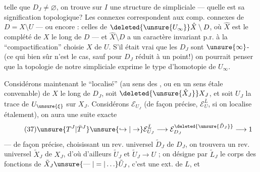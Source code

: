 
telle que $D_J\ne\varnothing$,  on trouve sur $I$ une structure de   simpliciale --- quelle est sa signification topologique? Les  connexes correspondent aux comp. connexes de $D=X\setminus U$ --- ou encore : celles de $\deleted{\unsure{U_\infty}}\hat X\setminus D$, où $\hat X$ est le  complété de $X$ le long de $D$ --- et $\hat X\setminus D$ a un caractère invariant p.r. à la ``compactification'' choisie $X$ de $U$. S'il était vrai que les $D_J$  sont $\unsure{\infty}$- (ce qui bien sûr n'est \uline{} le cas, sauf pour $D_J$ réduit à un point!) on pourrait penser que la topologie de notre   simpliciale exprime le type d'homotopie de $U_\infty$.

Considérons maintenant le ``localisé''  (au sens des , ou en un sens étale convenable) de $X$ le long de $D_J$, soit $\deleted{\unsure{\hat X_J}}X_J$, et soit $U_J$  la trace de $U_{\unsure{\xi}}$ sur $X_J$. Considérons $\mathcal E_{U_J}$ (de façon précise, $\mathcal E_U^{\bar L}$, si on localise  étalement), on aura une suite exacte
\[
\tag{37}
\unsure{T^J|\bar T^J}\unsure{\hookrightarrow|\to}\mathcal E_{U_J}^{\bar L}\longrightarrow\mathcal E_{D_J}^{\deleted{\unsure{\tilde D_J}}}\longrightarrow1
\]
--- de façon précise, choisissant un rev. universel $\tilde D_J$ de $D_J$, on trouvera un rev. universel  $\tilde X_J$ de $X_J$, d'où d'ailleurs $\tilde U_J$ et $\tilde U_J\longrightarrow U$ ;  on désigne par $\tilde L_J$ le corps des fonctions de $\tilde X_J\unsure{\mathrel{\text{---}}|=|\ldots}\tilde U_J$, c'est une ext.  de $L$, et





